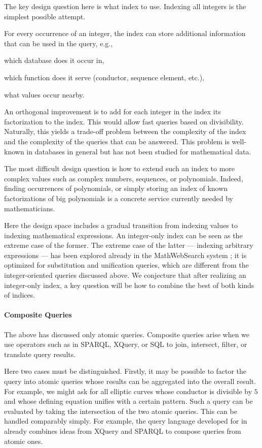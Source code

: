 The key design question here is what index to use.
Indexing all integers is the simplest possible attempt.

For every occurrence of an integer, the index can store additional information that can be used in the query, e.g.,
\begin{compactitem}
 \item which database does it occur in,
 \item which function does it serve (conductor, sequence element, etc.),
 \item what values occur nearby.
\end{compactitem}

An orthogonal improvement is to add for each integer in the index its factorization to the index.
This would allow fast queries based on divisibility.
Naturally, this yields a trade-off problem between the complexity of the index and the complexity of the queries that can be answered.
This problem is well-known in databases in general but has not been studied for mathematical data.

The most difficult design question is how to extend such an index to more complex values such as complex numbers, sequences, or polynomials.
Indeed, finding occurrences of polynomials, or simply storing an index of known factorizations of big polynomials is a concrete service currently needed by mathematicians.

Here the design space includes a gradual transition from indexing values to indexing mathematical expressions.
An integer-only index can be seen as the extreme case of the former.
The extreme case of the latter --- indexing arbitrary expressions --- has been explored already in the MathWebSearch system ; it is optimized for substitution and unification queries, which are different from the integer-oriented queries discussed above.
We conjecture that after realizing an integer-only index, a key question will be how to combine the best of both kinds of indices.

\paragraph{Composite Queries}
The above has discussed only atomic queries.
Composite queries arise when we use operators such as in SPARQL, XQuery, or SQL to join, intersect, filter, or translate query results.

Here two cases must be distinguished.
Firstly, it may be possible to factor the query into atomic queries whose results can be aggregated into the overall result.
For example, we might ask for all elliptic curves whose conductor is divisible by $5$ and whose defining equation unifies with a certain pattern.
Such a query can be evaluated by taking the intersection of the two atomic queries.
This can be handled comparably simply.
For example, the query language developed for \MMT in \cite{Rabe:qlfml12} already combines ideas from XQuery and SPARQL to compose queries from atomic ones.


